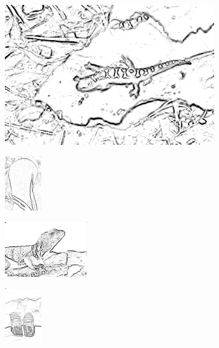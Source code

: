 \documentclass[journal]{IEEEtran}
\begin{document}
\begin{figure}[!ht]
    \begin{subfigure}[t]{\textwidth+20pt\relax}
    	\centering
    	\includegraphics[width=\dimexpr\linewidth-20pt\relax]{175083_4nn_cont} 
    \end{subfigure}      
    \begin{subfigure}[b]{0.23\textwidth}
    	\centering
        \includegraphics[height=67.68857pt]{101084_4nn_cont}
    \end{subfigure}
    \begin{subfigure}[b]{0.23\textwidth}
    	\centering
        \includegraphics[height=67.68857pt]{41096_4nn_cont}
    \end{subfigure}
    \begin{subfigure}[b]{0.23\textwidth}
    	\centering
        \includegraphics[height=67.68857pt]{2018_4nn_cont}
    \end{subfigure} \\ \vspace{-5pt} 
    

\end{figure}
\end{document}
